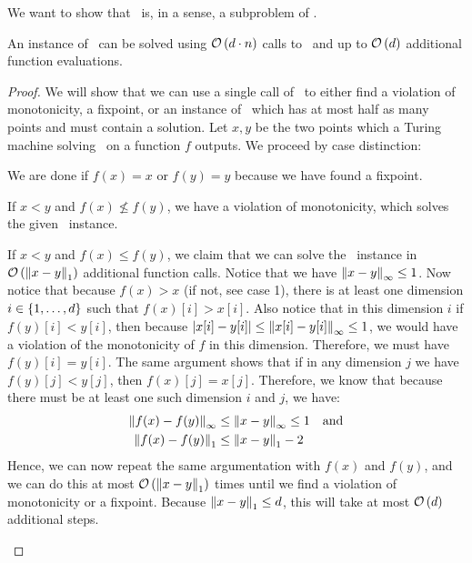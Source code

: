 We want to show that \Tarskistar\ is, in a sense, a subproblem of \Tarski.
\begin{lemma}
	An instance of \Tarski\ can be solved using $\mathcal{O}\left(d\cdot n\right)$ calls to \Tarskistar\ and up to $\mathcal{O}\left(d\right)$ additional function evaluations.
\end{lemma}
\begin{proof}
	We will show that we can use a single call of \Tarskistar\ to either find a violation of monotonicity, a fixpoint, or an instance of \Tarski\, which has at most half as many points and must contain a solution. Let $x, y$ be the two points which a Turing machine solving \Tarskistar\ on a function $f$ outputs. We proceed by case distinction:
	\begin{case}{1}
		We are done if $f(x) = x$ or $f(y) = y$ because we have found a fixpoint.
	\end{case}
	\begin{case}{2.1}
		If $x < y$ and $f(x) \not\leq f(y)$, we have a violation of monotonicity, which solves the given \Tarski\ instance.
	\end{case}
	\begin{case}{2.2}
		If $x < y$ and $f(x) \leq f(y)$, we claim that we can solve the \Tarski\ instance in $\mathcal{O}\left(\left\lVert x - y\right\rVert_{1}\right)$ additional function calls. Notice that we have $\left\lVert x-y\right\rVert_{\infty} \leq 1$. Now notice that because $f(x) > x$ (if not, see case 1), there is at least one dimension $i \in \left\{1, \dots, d\right\}$ such that $f(x)[i] > x[i]$. Also notice that in this dimension $i$ if $f(y)[i] < y[i]$, then because $\left\lvert x[i] - y[i]\right\rvert \leq \left\lVert x[i] - y[i]\right\rVert_{\infty} \leq 1$, we would have a violation of the monotonicity of $f$ in this dimension. Therefore, we must have $f(y)[i] = y[i]$. The same argument shows that if in any dimension $j$ we have $f(y)[j] < y[j]$, then $f(x)[j] = x[j]$. Therefore, we know that because there must be at least one such dimension $i$ and $j$, we have:
		\begin{align*}
			\left\lVert f(x) - f(y)\right\rVert_{\infty} & \leq \left\lVert x - y\right\rVert_{\infty} \leq 1 \quad \text{and} \\
			\left\lVert f(x) - f(y)\right\rVert_{1} & \leq \left\lVert x - y\right\rVert_{1} - 2
		\end{align*}
		Hence, we can now repeat the same argumentation with $f(x)$ and $f(y)$, and we can do this at most $\mathcal{O}\left(\left\lVert x - y\right\rVert_{1}\right)$ times until we find a violation of monotonicity or a fixpoint. Because $\left\lVert x - y\right\rVert_{1} \leq d$, this will take at most $\mathcal{O}\left(d\right)$ additional steps.
	\end{case}

\end{proof}
